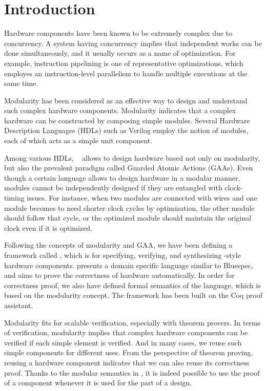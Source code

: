 \chapter{Introduction}

Hardware components have been known to be extremely complex due to
concurrency. A system having concurrency implies that independent
works can be done simultaneously, and it usually occurs as a name of
optimization. For example, instruction pipelining is one of
representative optimizations, which employes an instruction-level
parallelism to handle multiple executions at the same time.

Modularity has been considered as an effective way to design and
understand such complex hardware components. Modularity indicates that
a complex hardware can be constructed by composing simple
modules. Several Hardware Description Languages (HDLs) such as Verilog
employ the notion of modules, each of which acts as a simple unit
component.

Among various HDLs, \Bluespec{}~\cite{bsdef, bsref} allows to design
hardware based not only on modularity, but also the prevalent paradigm
called Guarded Atomic Actions (GAAs). Even though a certain language
allows to design hardware in a modular manner, modules cannot be
independently designed if they are entangled with clock-timing
issues. For instance, when two modules are connected with wires and
one module becomes to need shorter clock cycles by optimization, the
other module should follow that cycle, or the optimized module should
maintain the original clock even if it is optimized.

Following the concepts of modularity and GAA, we have been defining a
framework called \Kami{}, which is for specifying, verifying, and
synthesizing \Bluespec{}-style hardware components. \Kami{} presents a
domain specific language similar to Bluespec, and aims to prove the
correctness of hardware automatically. In order for correctness proof,
we also have defined formal semantics of the \Kami{} language, which
is based on the modularity concept. The framework has been built on
the Coq proof assistant.

Modularity fits for scalable verification, especially with theorem
provers. In terms of verification, modularity implies that complex
hardware components can be verified if each simple element is
verified. And in many cases, we reuse such simple components for
different uses. From the perspective of theorem proving, reusing a
hardware component indicates that we can also reuse its correctness
proof. Thanks to the modular semantics in \Kami{}, it is indeed
possible to use the proof of a component whenever it is used for the
part of a design.

